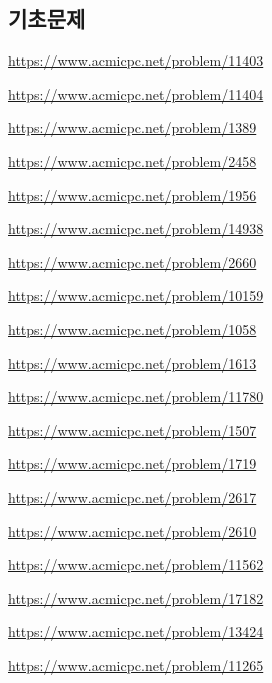 \subsection{기초문제}
\begin{problem} \url{https://www.acmicpc.net/problem/11403} \end{problem}
\begin{problem} \url{https://www.acmicpc.net/problem/11404} \end{problem}
\begin{problem} \url{https://www.acmicpc.net/problem/1389} \end{problem}
\begin{problem} \url{https://www.acmicpc.net/problem/2458} \end{problem}
\begin{problem} \url{https://www.acmicpc.net/problem/1956} \end{problem}
\begin{problem} \url{https://www.acmicpc.net/problem/14938} \end{problem}
\begin{problem} \url{https://www.acmicpc.net/problem/2660} \end{problem}
\begin{problem} \url{https://www.acmicpc.net/problem/10159} \end{problem}
\begin{problem} \url{https://www.acmicpc.net/problem/1058} \end{problem}
\begin{problem} \url{https://www.acmicpc.net/problem/1613} \end{problem}
\begin{problem} \url{https://www.acmicpc.net/problem/11780} \end{problem}
\begin{problem} \url{https://www.acmicpc.net/problem/1507} \end{problem}
\begin{problem} \url{https://www.acmicpc.net/problem/1719} \end{problem}
\begin{problem} \url{https://www.acmicpc.net/problem/2617} \end{problem}
\begin{problem} \url{https://www.acmicpc.net/problem/2610} \end{problem}
\begin{problem} \url{https://www.acmicpc.net/problem/11562} \end{problem}
\begin{problem} \url{https://www.acmicpc.net/problem/17182} \end{problem}
\begin{problem} \url{https://www.acmicpc.net/problem/13424} \end{problem}
\begin{problem} \url{https://www.acmicpc.net/problem/11265} \end{problem}

